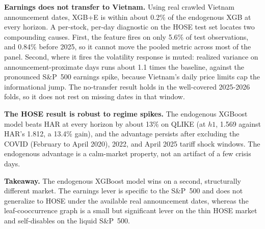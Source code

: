 \documentclass[runningheads]{llncs}
\begin{document}
\textbf{Earnings does not transfer to Vietnam.} Using real crawled Vietnam announcement dates, XGB+E is
within about 0.2\% of the endogenous XGB at every horizon. A per-stock, per-day diagnostic on the HOSE
test set locates two compounding causes. First, the feature fires on only 5.6\% of test observations,
and 0.84\% before 2025, so it cannot move the pooled metric across most of the panel. Second, where it
fires the volatility response is muted: realized variance on announcement-proximate days runs about
1.1 times the baseline, against the pronounced S\&P~500 earnings spike, because Vietnam's daily price
limits cap the informational jump. The no-transfer result holds in the well-covered 2025-2026 folds,
so it does not rest on missing dates in that window.

\textbf{The HOSE result is robust to regime spikes.} The endogenous XGBoost model beats HAR at every
horizon by about 13\% on QLIKE (at $h1$, 1.569 against HAR's 1.812, a 13.4\% gain), and the advantage
persists after excluding the COVID (February to April 2020), 2022, and April 2025 tariff shock windows.
The endogenous advantage is a calm-market property, not an artifact of a few crisis days.

\textbf{Takeaway.} The endogenous XGBoost model wins on a second, structurally different market. The
earnings lever is specific to the S\&P~500 and does not generalize to HOSE under the available real
announcement dates, whereas the leaf-cooccurrence graph is a small but significant lever on the thin
HOSE market and self-disables on the liquid S\&P~500.
\end{document}

